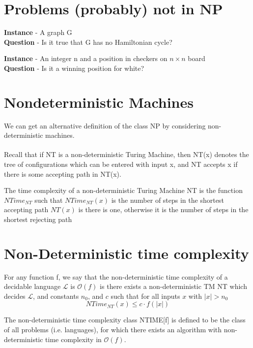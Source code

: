 \documentclass{article}[18pt]
\begin{document}
\section{Problems (probably) not in NP}
\begin{problem}
\textbf{Instance} - A graph G\\
\textbf{Question} - Is it true that G has no Hamiltonian cycle?
\end{problem}
\begin{problem}[Checkers]
\textbf{Instance} - An integer n and a position in checkers on $n\times n$ board\\
\textbf{Question} - Is it a winning position for white?
\end{problem}
\section{Nondeterministic Machines}
We can get an alternative definition of the class NP by considering non-deterministic machines.\\
\\
Recall that if NT is a non-deterministic Turing Machine, then NT(x) denotes the tree of configurations which can be entered with input x, and NT accepts x if there is some accepting path in NT(x).
\begin{definition}
The time complexity of a non-deterministic Turing Machine NT is the function $NTime_{NT}$ such that $NTime_{NT}(x)$ is the number of steps in the shortest accepting path $NT(x)$ is there is one, otherwise it is the number of steps in the shortest rejecting path
\end{definition}
\section{Non-Deterministic time complexity}
\begin{definition}
For any function f, we say that the non-deterministic time complexity of a decidable language $\mathcal{L}$ is $\mathcal{O}(f)$ is there exists a non-deterministic TM NT which decides $\mathcal{L}$, and constants $n_0$, and $c$ such that for all inputs $x$ with $|x|>n_0$
$$NTime_{NT}(x)\leqslant c\cdot f(|x|)$$
\end{definition}
\begin{definition}
The non-deterministic time complexity class NTIME[f] is defined to be the class of all problems (i.e. languages), for which there exists an algorithm with non-deterministic time complexity in $\mathcal{O}(f)$.
\end{definition}
\end{document}
